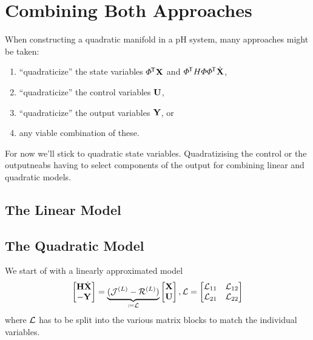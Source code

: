 \section{Combining Both Approaches}

When constructing a quadratic manifold in a pH system, many approaches might be taken:
\begin{enumerate}
    \item ``quadraticize'' the state variables $\varPhi^{\mkern-1.5mu \mathsf{T}} \mathbf{X}$ and $\varPhi^{\mkern-1.5mu \mathsf{T}} H \varPhi \varPhi^{\mkern-1.5mu \mathsf{T}} \dot{\mathbf{X}}$,
    \item ``quadraticize'' the control variables $\mathbf{U}$,
    \item ``quadraticize'' the output variables $\mathbf{Y}$, or
    \item any viable combination of these.
\end{enumerate}

For now we'll stick to quadratic state variables.
Quadratizising the control or the outputneabs having to select components of the output for combining linear and quadratic models.

\subsection{The Linear Model}\label{sec:lin-model}


\subsection{The Quadratic Model}\label{sec:quad-model}

We start of with a linearly approximated model
\begin{equation*}
    \begin{bmatrix}
        \mathbf{H} \dot{\mathbf{X}} \\
        -\mathbf{Y}
    \end{bmatrix} = \underbrace{(\mathcal{J}^{(L)} - \mathcal{R}^{(L)})}_{\coloneqq \mathcal{L}} \begin{bmatrix}
        \mathbf{X} \\
        \mathbf{U}
    \end{bmatrix}, \mathcal{L} = \begin{bmatrix}
        \mathcal{L}_{11} & \mathcal{L}_{12} \\
        \mathcal{L}_{21} & \mathcal{L}_{22}
    \end{bmatrix}
\end{equation*}
where $\mathcal{L}$ has to be split into the various matrix blocks to match the individual variables.

